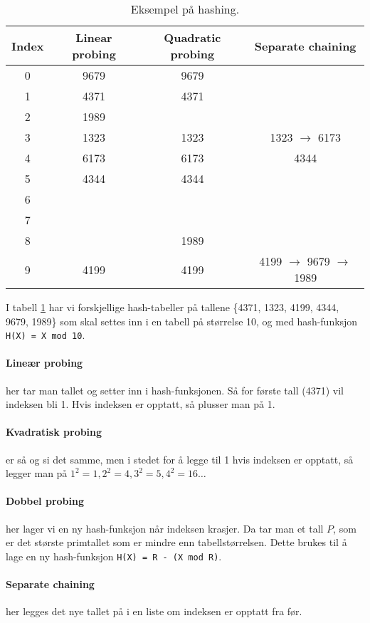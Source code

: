 \documentclass[11pt,a4paper]{article}
\theoremstyle{def}
\begin{document}
\begin{table}[h!]
\centering
\begin{tabular}{c|c|c|c}
Index & Linear probing & Quadratic probing & Separate chaining\\
\hline
0 & 9679 & 9679 &\\
1 & 4371 & 4371 & \\
2 & 1989 & &\\
3 & 1323 & 1323 & 1323 $\rightarrow$ 6173\\
4 & 6173 & 6173 & 4344\\
5 & 4344 & 4344 &\\
6 & & &\\
7 & & &\\
8 & & 1989 &\\
9 & 4199 & 4199 & 4199 $\rightarrow$ 9679 $\rightarrow$ 1989\\
\end{tabular}
\label{tab:hash}
\caption{Eksempel på hashing.}
\end{table}
I tabell \ref{tab:hash} har vi forskjellige hash-tabeller på tallene \{4371, 1323, 4199, 4344, 9679, 1989\} som skal settes inn i en tabell på størrelse 10, og med hash-funksjon \texttt{H(X) = X mod 10}.

\paragraph{Lineær probing} her tar man tallet og setter inn i hash-funksjonen. Så for første tall (4371) vil indeksen bli 1. Hvis indeksen er opptatt, så plusser man på 1.

\paragraph{Kvadratisk probing} er så og si det samme, men i stedet for å legge til 1 hvis indeksen er opptatt, så legger man på $1^2 = 1, 2^2 = 4, 3^2 = 5, 4^2 = 16\dots$ 

\paragraph{Dobbel probing} her lager vi en ny hash-funksjon når indeksen krasjer. Da tar man et tall $P$, som er det største primtallet som er mindre enn tabellstørrelsen. Dette brukes til å lage en ny hash-funksjon \texttt{H(X) = R - (X mod R)}.

\paragraph{Separate chaining} her legges det nye tallet på i en liste om indeksen er opptatt fra før.
\end{document}
